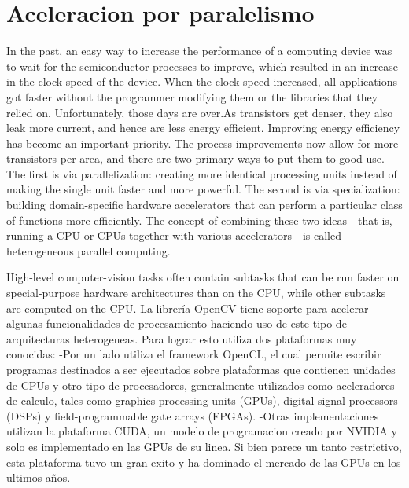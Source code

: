 \documentclass[a4paper,10pt]{report}
\begin{document}
\section{Aceleracion por paralelismo}



In the past, an easy way to increase the performance of a computing device was to wait for the semiconductor processes to improve, 
which resulted in an increase in the clock speed of the device. When the clock speed increased, 
all applications got faster without the programmer modifying them or the libraries that they relied on. 
Unfortunately, those days are over.As transistors get denser, they also leak more current, and hence are less energy efficient. 
Improving energy efficiency has become an important priority. 
The process improvements now allow for more transistors per area, and there are two primary ways to put them to good use. 
The first is via parallelization: creating more identical processing units instead of making the single unit faster and more powerful. 
The second is via specialization: building domain-specific hardware accelerators that can perform a particular class of functions more efficiently.
The concept of combining these two ideas—that is, running a CPU or CPUs together with various accelerators—is called heterogeneous parallel computing.

High-level computer-vision tasks often contain subtasks that can be run faster on special-purpose hardware architectures than on the CPU, while other subtasks are computed on the CPU.
La librería OpenCV tiene soporte para acelerar algunas funcionalidades de procesamiento haciendo uso de este tipo de arquitecturas heterogeneas. 
Para lograr esto utiliza dos plataformas muy conocidas:
-Por un lado utiliza el framework OpenCL, el cual permite escribir programas destinados a ser ejecutados sobre plataformas que contienen unidades de CPUs y otro tipo de procesadores, 
generalmente utilizados como aceleradores de calculo, tales como  graphics processing units (GPUs), digital signal processors (DSPs) y field-programmable gate arrays (FPGAs).
-Otras implementaciones utilizan la plataforma CUDA, un modelo de programacion creado por NVIDIA y solo es implementado en las GPUs de su linea. Si bien parece un tanto restrictivo, 
esta plataforma tuvo un gran exito y ha dominado el mercado de las GPUs en los ultimos años.
\end{document}
